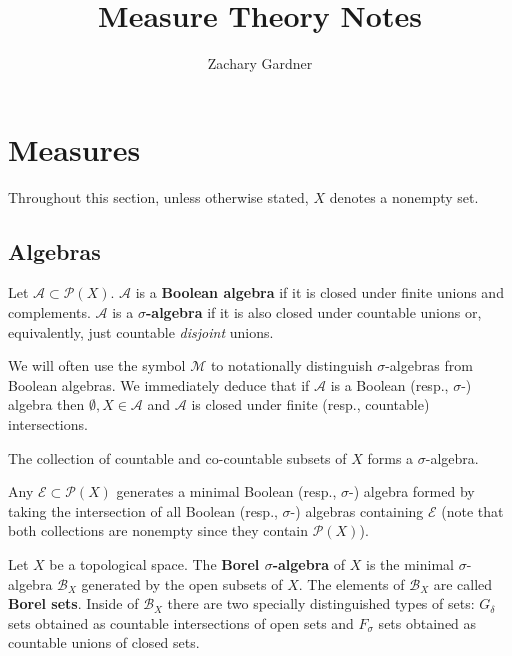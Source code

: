 \documentclass[11pt]{article}
\renewcommand{\A}{\mathcal{A}}
\newcommand{\B}{\mathcal{B}}
\newcommand{\E}{\mathcal{E}}
\newcommand{\M}{\mathcal{M}}
\renewcommand{\P}{\mathcal{P}}
\begin{document}
\title{Measure Theory Notes}
\author{Zachary Gardner}
\date{}
\maketitle

\tableofcontents
\newpage

\section{Measures}
Throughout this section, unless otherwise stated, $X$ denotes a nonempty set.

\subsection{Algebras}
\begin{definition}
Let $\A\subset\P(X)$. $\A$ is a \textbf{Boolean algebra} if it is closed under finite unions and complements. $\A$ is a \textbf{$\sigma$-algebra} if it is also closed under countable unions or, equivalently, just countable \emph{disjoint} unions. 
\end{definition}

We will often use the symbol $\M$ to notationally distinguish $\sigma$-algebras from Boolean algebras. We immediately deduce that if $\A$ is a Boolean (resp., $\sigma$-) algebra then $\emptyset,X\in\A$ and $\A$ is closed under finite (resp., countable) intersections.

\begin{example}
The collection of countable and co-countable subsets of $X$ forms a $\sigma$-algebra.
\end{example}

Any $\E\subset\P(X)$ generates a minimal Boolean (resp., $\sigma$-) algebra formed by taking the intersection of all Boolean (resp., $\sigma$-) algebras containing $\E$ (note that both collections are nonempty since they contain $\P(X)$). 

\begin{definition}
Let $X$ be a topological space. The \textbf{Borel $\sigma$-algebra} of $X$ is the minimal $\sigma$-algebra $\B_X$ generated by the open subsets of $X$. The elements of $\B_X$ are called \textbf{Borel sets}. Inside of $\B_X$ there are two specially distinguished types of sets: $G_{\delta}$ sets obtained as countable intersections of open sets and $F_{\sigma}$ sets obtained as countable unions of closed sets. 
\end{definition}
\end{document}

